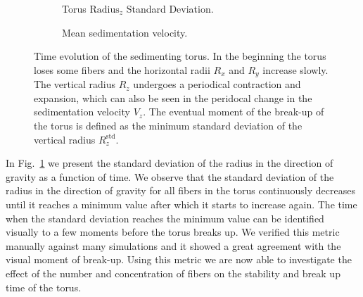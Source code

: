 \begin{figure}[!htbp]
\begin{subfigure}[h]{.48\textwidth}
    \caption{Torus $\text{Radius}_z$ Standard Deviation.}\label{fig:torus_deviation}
  \end{subfigure}
  \begin{subfigure}[h]{.48\textwidth}
    \caption{Mean sedimentation velocity.}\label{fig:torus_velocity}
  \end{subfigure}
  \caption[Time evolution of the sedimenting torus.]{Time evolution of the sedimenting torus. In the beginning the torus loses some fibers and the horizontal radii $R_x$ and $R_y$ increase slowly. The vertical radius $R_z$ undergoes a periodical contraction and expansion, which can also be seen in the peridocal change in the sedimentation velocity $V_z$. The eventual moment of the break-up of the torus is defined as the minimum standard deviation of the vertical radius $R_z^{\text{std}}$.}
  \label{fig:torus}
\end{figure}

In Fig.~\ref{fig:torus_deviation} we present the standard deviation of the radius in the direction of gravity as a function of time. We observe that the standard deviation of the radius in the direction of gravity for all fibers in the torus continuously decreases until it reaches a minimum value after which it starts to increase again. The time when the standard deviation reaches the minimum value can be identified visually to a few moments before the torus breaks up. We verified this metric manually against many simulations and it showed a great agreement with the visual moment of break-up. Using this metric we are now able to investigate the effect of the number and concentration of fibers on the stability and break up time of the torus.

